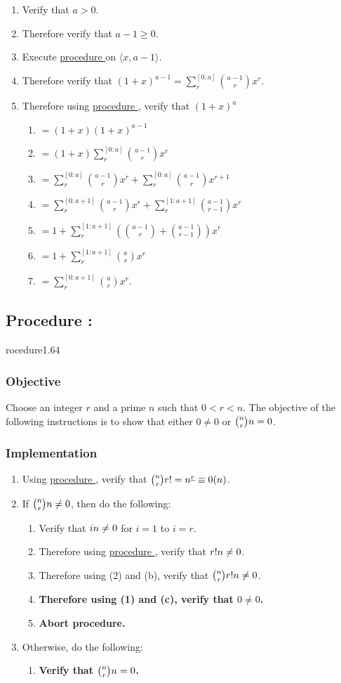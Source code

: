 \documentclass{article}
\let\mod\relax\DeclareMathOperator{\mod}{mod}
\newcommand{\ul}[1]{\protect\underline{#1}}
\newcounter{procedure}[part]
\newcommand{\procedure}[1]{\subsection*{Procedure \thepart:\theprocedure}\label{sec:procedure #1}\global\expandafter\edef\csname procedure#1\endcsname{\thepart:\theprocedure}\addtocounter{procedure}{1}}
\newcommand{\objective}{\subsubsection*{Objective}}
\newcommand{\implementation}{\subsubsection*{Implementation}}
\newcommand{\procedurehr}[1]{\hyperref[sec:procedure #1]{procedure \expandafter\csname procedure#1\endcsname}}
\begin{document}
\begin{multicols}{2}
\begin{enumerate}
					\begin{enumerate}
						\item Verify that $a>0$.
						\item Therefore verify that $a-1\ge 0$.
						\item Execute \procedurehr{1.63} on $\langle x,a-1\rangle$.
						\item Therefore verify that $(1+x)^{a-1}=\sum_r^{[0:{a}]}\binom{a-1}{r}x^r$.
						\item Therefore using \procedurehr{1.62}, verify that $(1+x)^a$
						\begin{enumerate}
							\item $=(1+x)(1+x)^{a-1}$
							\item $=(1+x)\sum_r^{[0:{a}]}\binom{a-1}{r}x^r$
							\item $=\sum_r^{[0:{a}]}\binom{a-1}{r}x^r+\sum_r^{[0:{a}]}\binom{a-1}{r}x^{r+1}$
							\item $=\sum_r^{[0:{a+1}]}\binom{a-1}{r}x^r+\sum_r^{[1:{a+1}]}\binom{a-1}{r-1}x^{r}$
							\item $=1+\sum_r^{[1:{a+1}]}(\binom{a-1}{r}+\binom{a-1}{r-1})x^{r}$
							\item $=1+\sum_r^{[1:{a+1}]}\binom{a}{r}x^{r}$
							\item $=\sum_r^{[0:{a+1}]}\binom{a}{r}x^{r}$.
						\end{enumerate}
					\end{enumerate}
				\end{enumerate}
		\procedure{1.64}
			\objective
				Choose an integer $r$ and a prime $n$ such that $0<r<n$. The objective of the following instructions is to show that either $0\ne 0$ or $\binom{n}{r}\mod n=0$.
			\implementation
				\begin{enumerate}
					\item Using \procedurehr{1.61}, verify that $\binom{n}{r}r!=n^{\ul{r}}\equiv 0(\mod n)$.
					\item If $\binom{n}{r}\mod n\ne 0$, then do the following:
					\begin{enumerate}
						\item Verify that $i\mod n\ne 0$ for $i=1$ to $i=r$.
						\item Therefore using \procedurehr{1.23}, verify that $r!\mod n\ne 0$.
						\item Therefore using (2) and (b), verify that $\binom{n}{r}r!\mod n\ne 0$.
						\item \textbf{Therefore using (1) and (c), verify that $0\ne 0$.}
						\item \textbf{Abort procedure.}
					\end{enumerate}
					\item Otherwise, do the following:
					\begin{enumerate}
						\item \textbf{Verify that $\binom{n}{r}\mod n=0$.}
					\end{enumerate}
				\end{enumerate}
	\end{multicols}
	\clearpage
\end{document}
